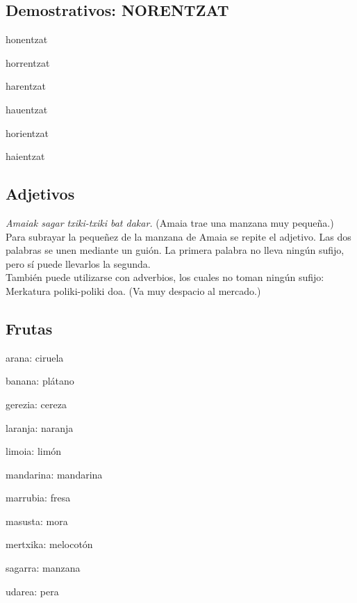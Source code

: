 \documentclass[11pt, a4paper]{article}
\begin{document}
\subsection{Demostrativos: NORENTZAT}
\begin{itemize}
\begin{multicols}{2}
\item honentzat
\item horrentzat
\item harentzat
\item hauentzat
\item horientzat
\item haientzat
\end{multicols}
\end{itemize}

\subsection{Adjetivos}
\indent \indent \textit{Amaiak sagar txiki-txiki bat dakar.}
(Amaia trae una manzana muy pequeña.)\\
\noindent Para subrayar la pequeñez de la manzana de Amaia se repite el adjetivo. Las dos palabras se unen mediante un guión. La primera palabra no lleva ningún sufijo, pero sí puede llevarlos la segunda.\\

\noindent También puede utilizarse con adverbios, los cuales no toman ningún sufijo:\\
\indent Merkatura poliki-poliki doa.
(Va muy despacio al mercado.)

\subsection{Frutas}
\begin{itemize}
\begin{multicols}{2}
\item arana: ciruela
\item banana: plátano
\item gerezia: cereza
\item laranja: naranja
\item limoia: limón
\item mandarina: mandarina
\item marrubia: fresa
\item masusta: mora
\item mertxika: melocotón
\item sagarra: manzana
\item udarea: pera
\end{multicols}
\end{itemize}
\end{document}
